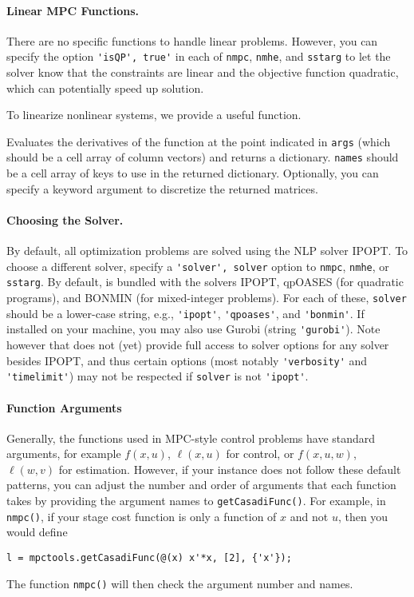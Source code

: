 \documentclass{article}
\begin{document}
\begin{multicols}{2}
\paragraph*{Linear MPC Functions.}

There are no specific functions to handle linear problems.
However, you can specify the option \lstinline|'isQP', true'| in each of \texttt{nmpc}, \texttt{nmhe}, and \texttt{sstarg} to let the solver know that the constraints are linear and the objective function quadratic, which can potentially speed up solution.

To linearize nonlinear systems, we provide a useful function.


Evaluates the derivatives of the \casadi{} function \lstinline@f@ at the point indicated in \lstinline$args$ (which should be a cell array of column vectors) and returns a dictionary.
\lstinline$names$ should be a cell array of keys to use in the returned dictionary.
Optionally, you can specify a \lstinline@Delta@ keyword argument to discretize the returned matrices.

\paragraph*{Choosing the Solver.}

By default, all optimization problems are solved using the NLP solver IPOPT.
To choose a different solver, specify a \lstinline|'solver', solver| option to \texttt{nmpc}, \texttt{nmhe}, or \texttt{sstarg}.
By default, \casadi is bundled with the solvers IPOPT, qpOASES (for quadratic programs), and BONMIN (for mixed-integer problems).
For each of these, \texttt{solver} should be a lower-case string, e.g., \lstinline|'ipopt'|, \lstinline|'qpoases'|, and \lstinline|'bonmin'|.
If installed on your machine, you may also use Gurobi (string \lstinline|'gurobi'|).
Note however that \casadi{} does not (yet) provide full access to solver options for any solver besides IPOPT, and thus certain options (most notably \lstinline|'verbosity'| and \lstinline|'timelimit'|) may not be respected if \texttt{solver} is not \lstinline|'ipopt'|.

\paragraph*{Function Arguments}

Generally, the functions used in MPC-style control problems have standard arguments, for example $f(x,u)$, $\ell(x,u)$ for control, or $f(x,u,w)$, $\ell(w,v)$ for estimation.
However, if your instance does not follow these default patterns, you can adjust the number and order of arguments that each function takes by providing the argument names to \lstinline|getCasadiFunc()|.
For example, in \lstinline|nmpc()|, if your stage cost function is only a function of $x$ and not $u$, then you would define
%
\begin{lstlisting}[frame=L]
l = mpctools.getCasadiFunc(@(x) x'*x, [2], {'x'});
\end{lstlisting}
%
The function \lstinline|nmpc()| will then check the argument number and names.


\end{multicols}
\end{document}
